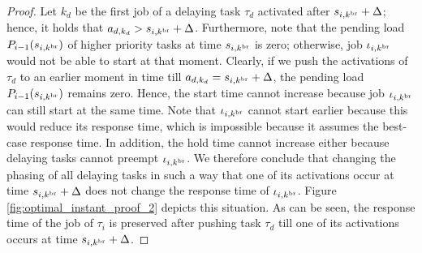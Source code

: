 \begin{proof}

	
	Let $k_d$ be the first job of a delaying task $\tau_d$ activated after $s_{i,k^{\rm{br}}}+\Delta$; hence, it holds that $a_{d,k_d} > s_{i,k^{\rm{br}}}+\Delta$. Furthermore, note that the pending load $P_{i-1}(s_{i,k^{\rm{br}}})$ of higher priority tasks at time $s_{i,k^{\rm{br}}}$ is zero; otherwise, job $\iota_{i,k^{\rm{br}}}$ would not be able to start at that moment. Clearly, if we push the activations of $\tau_d$ to an earlier moment in time till $a_{d,k_d} = s_{i,k^{\rm{br}}}+\Delta$, the pending load $P_{i-1}(s_{i,k^{\rm{br}}})$ remains zero. Hence, the start time cannot increase because job $\iota_{i,k^{\rm{br}}}$ can still start at the same time. Note that $\iota_{i,k^{\rm{br}}}$ cannot start earlier because this would reduce its response time, which is impossible because it assumes the best-case response time. In addition, the hold time cannot increase either because delaying tasks cannot preempt $\iota_{i,k^{\rm{br}}}$. We therefore conclude that changing the phasing of all delaying tasks in such a way that one of its activations occur at time $s_{i,k^{\rm{br}}}+\Delta$ does not change the response time of $\iota_{i,k^{\rm{br}}}$.  Figure \ref{fig:optimal_instant_proof_2} depicts this situation. As can be seen, the response time of the job of $\tau_i$ is preserved after pushing task $\tau_d$ till one of its activations occurs at time $s_{i,k^{\rm{br}}}+\Delta$.
	

\end{proof}
